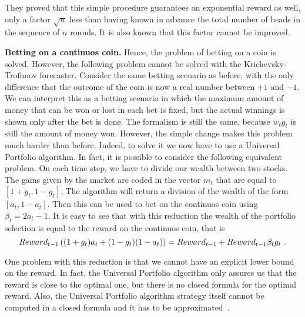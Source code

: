 They proved that this simple procedure guarantees an exponential reward as well, only a factor $\sqrt{n}$ less than having known in advance the total number of heads in the sequence of $n$ rounds. It is also known that this factor cannot be improved.

\textbf{Betting on a continuos coin.}
Hence, the problem of betting on a coin is solved. However, the following problem cannot be solved with the Krichevsky-Trofimov forecaster. Consider the same betting scenario as before, with the only difference that the outcome of the coin is now a real number between $+1$ and $-1$. We can interpret this as a betting scenario in which the maximum amount of money that can be won or lost in each bet is fixed, but the actual winnings is shown only after the bet is done. The formalism is still the same, because $w_t g_t$ is still the amount of money won. However, the simple change makes this problem much harder than before. Indeed, to solve it we now have to use a Universal Portfolio algorithm. In fact, it is possible to consider the following equivalent problem. On each time step, we have to divide our wealth between two stocks. The gains given by the market are coded in the vector $m_t$ that are equal to $[1+g_t, 1-g_t]$. The algorithm will return a division of the wealth of the form $[a_t, 1-a_t]$. Then this can be used to bet on the continuos coin using $\beta_t=2 a_t-1$.
It is easy to see that with this reduction the wealth of the portfolio selection is equal to the reward on the continuos coin, that is
\[
Reward_{t-1} \left((1+g_t) a_t+(1-g_t)(1-a_t)\right)=Reward_{t-1}+Reward_{t-1} \beta_t g_t~.
\]

One problem with this reduction is that we cannot have an explicit lower bound on the reward. In fact, the Universal Portfolio algorithm only assures us that the reward is close to the optimal one, but there is no closed formula for the optimal reward.
Also, the Universal Portfolio algorithm strategy itself cannot be computed in a closed formula and it has to be approximated~\cite{KalaiV03}.
